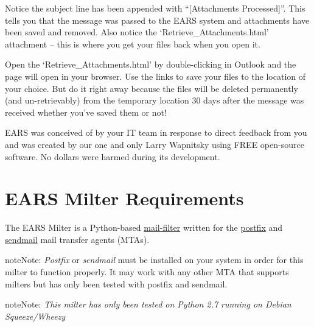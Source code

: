 \documentclass[letterpaper,10pt,english]{sphinxmanual}
\begin{document}
Notice the subject line has been appended with “{[}Attachments Processed{]}”. This tells you that the message was passed to the EARS system and attachments have been saved and removed. Also notice the ‘Retrieve\_Attachments.html’ attachment – this is where you get your files back when you open it.

Open the ‘Retrieve\_Attachments.html’ by double-clicking in Outlook and the page will open in your browser. Use the links to save your files to the location of your choice. But do it right away because the files will be deleted permanently (and un-retrievably) from the temporary location 30 days after the message was received whether you’ve saved them or not!

EARS was conceived of by your IT team in response to direct feedback from you and was created by our one and only Larry Wapnitsky using FREE open-source software. No dollars were harmed during its development.


\chapter{EARS Milter Requirements}
\label{requirements:ears-milter-requirements}\label{requirements::doc}
The EARS Milter is a Python-based \href{http://www.milter.orghttp://www.webmin.com/deb.html}{mail-filter} written for the \href{http://www.postfix.org}{postfix} and \href{http://www.sendmail.com/sm/open\_source/docs/}{sendmail} mail transfer agents (MTAs).

\begin{notice}{note}{Note:}
\emph{Postfix} or \emph{sendmail} must be installed on your system in order for this milter to function properly.
It may work with any other MTA that supports milters but has only been tested with postfix and sendmail.
\end{notice}

\begin{notice}{note}{Note:}
\emph{This milter has only been tested on Python 2.7 running on Debian Squeeze/Wheezy}
\end{notice}
\end{document}
